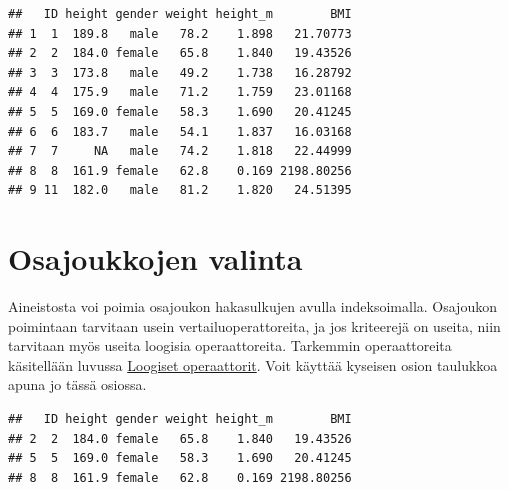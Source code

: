 \documentclass[
]{book}
\newenvironment{Shaded}{\begin{snugshade}}{\end{snugshade}}
\newcommand{\CommentTok}[1]{\textcolor[rgb]{0.56,0.35,0.01}{\textit{#1}}}
\newcommand{\DecValTok}[1]{\textcolor[rgb]{0.00,0.00,0.81}{#1}}
\newcommand{\NormalTok}[1]{#1}
\newcommand{\SpecialCharTok}[1]{\textcolor[rgb]{0.00,0.00,0.00}{#1}}
\newcommand{\StringTok}[1]{\textcolor[rgb]{0.31,0.60,0.02}{#1}}
\begin{document}
\begin{verbatim}
##   ID height gender weight height_m        BMI
## 1  1  189.8   male   78.2    1.898   21.70773
## 2  2  184.0 female   65.8    1.840   19.43526
## 3  3  173.8   male   49.2    1.738   16.28792
## 4  4  175.9   male   71.2    1.759   23.01168
## 5  5  169.0 female   58.3    1.690   20.41245
## 6  6  183.7   male   54.1    1.837   16.03168
## 7  7     NA   male   74.2    1.818   22.44999
## 8  8  161.9 female   62.8    0.169 2198.80256
## 9 11  182.0   male   81.2    1.820   24.51395
\end{verbatim}

\hypertarget{osajoukkojen-valinta}{%
\section{Osajoukkojen valinta}\label{osajoukkojen-valinta}}

Aineistosta voi poimia osajoukon hakasulkujen avulla indeksoimalla. Osajoukon poimintaan tarvitaan usein vertailuoperattoreita, ja jos kriteerejä on useita, niin tarvitaan myös useita loogisia operaattoreita. Tarkemmin operaattoreita käsitellään luvussa \protect\hyperlink{loogiset-operaattorit}{Loogiset operaattorit}. Voit käyttää kyseisen osion taulukkoa apuna jo tässä osiossa.

\begin{Shaded}
\end{Shaded}

\begin{verbatim}
##   ID height gender weight height_m        BMI
## 2  2  184.0 female   65.8    1.840   19.43526
## 5  5  169.0 female   58.3    1.690   20.41245
## 8  8  161.9 female   62.8    0.169 2198.80256
\end{verbatim}

\begin{Shaded}
\end{Shaded}
\end{document}
